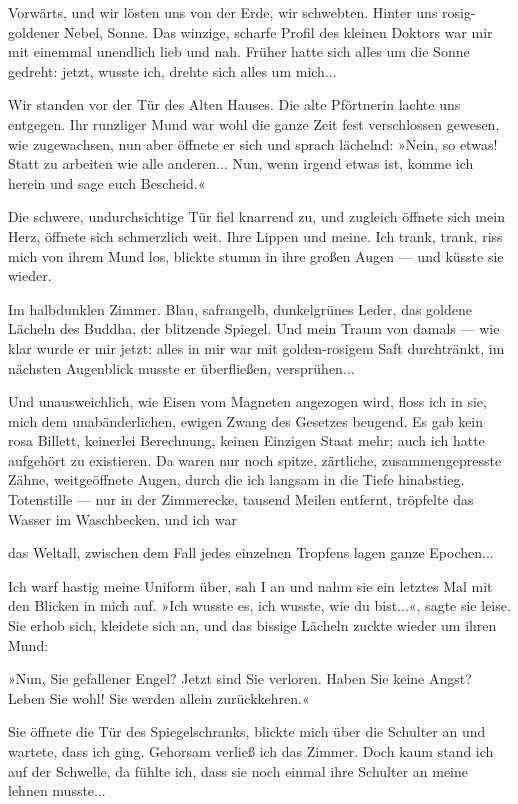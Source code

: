 Vorwärts, und wir lösten uns von der Erde, wir schwebten. Hinter
uns rosig-goldener Nebel, Sonne. Das winzige, scharfe Profil des
kleinen Doktors war mir mit einemmal unendlich lieb und nah. Früher
hatte sich alles um die Sonne gedreht: jetzt, wusste ich, drehte
sich alles um mich...

Wir standen vor der Tür des Alten Hauses. Die alte Pförtnerin
lachte uns entgegen. Ihr runzliger Mund war wohl die ganze Zeit
fest verschlossen gewesen, wie zugewachsen, nun aber öffnete er
sich und sprach lächelnd: »Nein, so etwas! Statt zu arbeiten wie
alle anderen... Nun, wenn irgend etwas ist, komme ich herein und
sage euch Bescheid.«

Die schwere, undurchsichtige Tür fiel knarrend zu, und zugleich
öffnete sich mein Herz, öffnete sich schmerzlich weit. Ihre Lippen
und meine. Ich trank, trank, riss mich von ihrem Mund los, blickte
stumm in ihre großen Augen — und küsste sie wieder.

Im halbdunklen Zimmer. Blau, safrangelb, dunkelgrünes Leder, das
goldene Lächeln des Buddha, der blitzende Spiegel. Und mein Traum
von damals — wie klar wurde er mir jetzt: alles in mir war mit
golden-rosigem Saft durchtränkt, im nächsten Augenblick musste er
überfließen, versprühen...

Und unausweichlich, wie Eisen vom Magneten angezogen wird, floss
ich in sie, mich dem unabänderlichen, ewigen Zwang des Gesetzes
beugend. Es gab kein rosa Billett, keinerlei Berechnung, keinen
Einzigen Staat mehr; auch ich hatte aufgehört zu existieren. Da
waren nur noch spitze, zärtliche, zusammengepresste Zähne,
weitgeöffnete Augen, durch die ich langsam in die Tiefe hinabstieg.
Totenstille — nur in der Zimmerecke, tausend Meilen entfernt,
tröpfelte das Wasser im Waschbecken, und ich war

das Weltall, zwischen dem Fall jedes einzelnen Tropfens lagen ganze
Epochen...

Ich warf hastig meine Uniform über, sah I an und nahm sie ein
letztes Mal mit den Blicken in mich auf. »Ich wusste es, ich
wusste, wie du bist...«, sagte sie leise. Sie erhob sich, kleidete
sich an, und das bissige Lächeln zuckte wieder um ihren Mund:

»Nun, Sie gefallener Engel? Jetzt sind Sie verloren. Haben Sie
keine Angst? Leben Sie wohl! Sie werden allein zurückkehren.«

Sie öffnete die Tür des Spiegelschranks, blickte mich über die
Schulter an und wartete, dass ich ging. Gehorsam verließ ich das
Zimmer. Doch kaum stand ich auf der Schwelle, da fühlte ich, dass
sie noch einmal ihre Schulter an meine lehnen musste...

